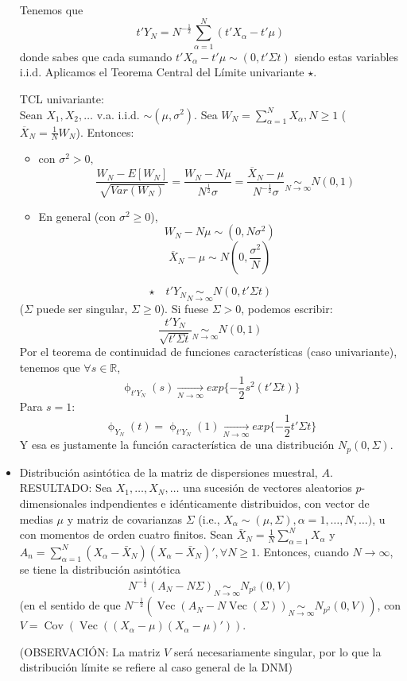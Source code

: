 \documentclass[11pt,a4paper]{article}
\begin{document}
\begin{itemize}
Tenemos que
$$t'Y_{N} = N^{-\frac{1}{2}} \sum_{\alpha=1}^{N}(t'X_{\alpha} - t'\mu)$$
donde sabes que cada sumando $t'X_{\alpha}-t'\mu \sim (0, t' \Sigma t)$ siendo estas variables i.i.d. Aplicamos el Teorema Central del Límite univariante $\star$.

TCL univariante: \\
Sean $X_{1}, X_{2}, \dots$ v.a. i.i.d. $\sim (\mu, \sigma^{2})$. Sea $W_{N} = \sum_{\alpha=1}^{N} X_{\alpha}, N \geq 1$ ($\overline{X}_{N} = \frac{1}{N}W_{N}$). Entonces:
\begin{itemize}
\item con $\sigma^{2} > 0,$ $$\quad \frac{W_{N} - E[W_{N}]}{\sqrt{Var(W_{N})}} = \frac{W_{N} - N\mu}{N^{\frac{1}{2}}\sigma} = \frac{\overline{X}_{N}-\mu}{N^{-\frac{1}{2}}\sigma} \underset{N \to \infty}{\sim} N(0, 1)$$
\item En general (con $\sigma^{2} \geq 0$), $$W_{N} - N\mu \sim (0, N\sigma^{2})$$
$$\overline{X}_{N} - \mu \sim N(0, \frac{\sigma^{2}}{N})$$
\end{itemize}

$$\star \quad t'Y_{N} \underset{N \to \infty}{\sim} N(0, t' \Sigma t)$$
($\Sigma$ puede ser singular, $\Sigma \geq 0$). Si fuese $\Sigma > 0$, podemos escribir:
$$\frac{t'Y_{N}}{\sqrt{t' \Sigma t}} \underset{N \to \infty}{\sim} N(0, 1)$$
Por el teorema de continuidad de funciones características (caso univariante), tenemos que $\forall s \in \mathbb{R}$,
$$\upphi_{t'Y_{N}}(s) \underset{N \to \infty}{\longrightarrow} exp\{-\frac{1}{2}s^{2}(t' \Sigma t)\}$$
Para $s=1$:
$$\upphi_{Y_{N}}(t) = \upphi_{t'Y_{N}}(1) \underset{N \to \infty}{\longrightarrow} exp\{-\frac{1}{2} t' \Sigma t\}$$
Y esa es justamente la función característica de una distribución $N_{p}(0, \Sigma)$.

\item Distribución asintótica de la matriz de dispersiones muestral, $A$. \\
RESULTADO: Sea $X_{1}, \dots, X_{N}, \dots$ una sucesión de vectores aleatorios $p$-dimensionales indpendientes e idénticamente distribuidos, con vector de medias $\mu$ y matriz de covarianzas $\Sigma$ (i.e., $X_{\alpha} \sim (\mu, \Sigma), \alpha = 1, \dots, N, \dots)$, u con momentos de orden cuatro finitos. Sean $\bar{X}_{N} = \frac{1}{N}\sum_{\alpha=1}^{N} X_{\alpha}$ y $A_{n} = \sum_{\alpha=1}^{N}(X_{\alpha} - \bar{X}_{N})(X_{\alpha} - \bar{X}_{N})', \forall N \geq 1$. Entonces, cuando $N \to \infty$, se tiene la distribución asintótica
$$N^{-\frac{1}{2}}(A_{N} - N\Sigma) \underset{N \to \infty}{\sim} N_{p^{2}}(0, V)$$
(en el sentido de que $N^{-\frac{1}{2}}(\operatorname{Vec}(A_{N} - N\operatorname{Vec}(\Sigma)) \underset{N \to \infty}{\sim} N_{p^{2}}(0, V))$, con $V = \operatorname{Cov}(\operatorname{Vec}((X_{\alpha} - \mu)(X_{\alpha} - \mu)'))$.

(OBSERVACIÓN: La matriz $V$ será necesariamente singular, por lo que la distribución límite se refiere al caso general de la DNM)
\end{itemize}
\end{document}
